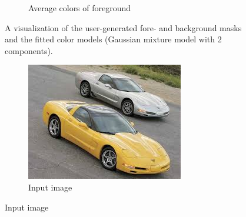 \documentclass[a4paper]{article}
\begin{document}
\begin{figure}[ht]
\begin{subfigure}[h]{0.48\textwidth}
	\caption*{Average colors of foreground}
	\end{subfigure}
\caption{A visualization of the user-generated fore- and background masks and the fitted color models (Gaussian mixture model with 2 components).}
\label{fig:cow}
\end{figure}

\begin{figure}[ht]
	\centering
	\begin{subfigure}[h]{0.48\textwidth}
		\centering
		\includegraphics[width=\textwidth]{imgs/fbcars.jpg}
		\caption*{Input image}
	\end{subfigure}
	

\end{figure}
\end{document}
